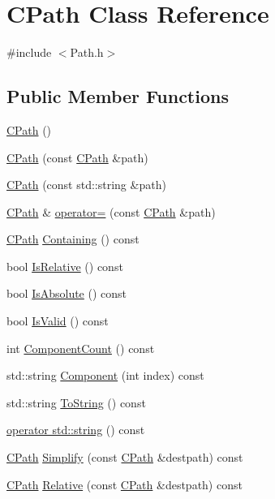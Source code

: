 \hypertarget{classCPath}{}\section{C\+Path Class Reference}
\label{classCPath}


{\ttfamily \#include $<$Path.\+h$>$}

\subsection*{Public Member Functions}
\begin{DoxyCompactItemize}
\item 
\hyperlink{classCPath_a26b6e34c8019d440136848f809c13897}{C\+Path} ()
\item 
\hyperlink{classCPath_a728b9e9aea13c9dc51b9bb1f6dbc76fd}{C\+Path} (const \hyperlink{classCPath}{C\+Path} \&path)
\item 
\hyperlink{classCPath_aceb476f21440713272cf0ef38f2619c6}{C\+Path} (const std\+::string \&path)
\item 
\hyperlink{classCPath}{C\+Path} \& \hyperlink{classCPath_a6f3121638129c293fca7bbeecd8b0ad3}{operator=} (const \hyperlink{classCPath}{C\+Path} \&path)
\item 
\hyperlink{classCPath}{C\+Path} \hyperlink{classCPath_a24d8c455b1663ce251d3a749437fa4fe}{Containing} () const
\item 
bool \hyperlink{classCPath_a59cf4c412366aef121fcbc97339ad13b}{Is\+Relative} () const
\item 
bool \hyperlink{classCPath_a613d8d4c4b72dba9fc8b6e487f583d7d}{Is\+Absolute} () const
\item 
bool \hyperlink{classCPath_a248abbdeb912f48ba4100680540e2061}{Is\+Valid} () const
\item 
int \hyperlink{classCPath_ab399818c519c46871306f9851dd8141d}{Component\+Count} () const
\item 
std\+::string \hyperlink{classCPath_a7396f770babe0fbea344afa76d31da7c}{Component} (int index) const
\item 
std\+::string \hyperlink{classCPath_abbafaf377a7e38e0151bd9567d526951}{To\+String} () const
\item 
\hyperlink{classCPath_a8fade0e7a418c92d5f68ac8872dda8b1}{operator std\+::string} () const
\item 
\hyperlink{classCPath}{C\+Path} \hyperlink{classCPath_aa52dcb50c943a8abc8883db5ec43a45e}{Simplify} (const \hyperlink{classCPath}{C\+Path} \&destpath) const
\item 
\hyperlink{classCPath}{C\+Path} \hyperlink{classCPath_aaf49ee9d0f8ed1ffa6bb5e18aba86b4f}{Relative} (const \hyperlink{classCPath}{C\+Path} \&destpath) const
\end{DoxyCompactItemize}
